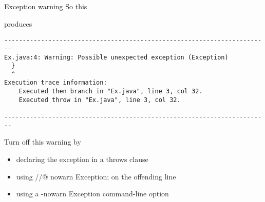 \documentclass[
pdf,
nocolorBG,
slideColor,
cok,
]{prosper}
\begin{document}

\begin{slide}{Exception warning}
\vspace*{-12ex}
So this
\begin{figure*}
\tiny


\end{figure*}
produces
{\tiny

\begin{verbatim}
------------------------------------------------------------------------
Ex.java:4: Warning: Possible unexpected exception (Exception)
  }
  ^
Execution trace information:
    Executed then branch in "Ex.java", line 3, col 32.
    Executed throw in "Ex.java", line 3, col 32.

------------------------------------------------------------------------
\end{verbatim}
}
Turn off this warning by
\begin{itemize}
\item declaring the exception in a throws clause
\item using {\knalblue //@ nowarn Exception; } on the offending line
\item using a {\knalblue -nowarn Exception} command-line option
\end{itemize}
\end{slide}


\end{document}
